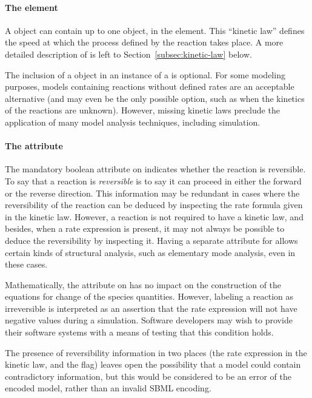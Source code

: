 \paragraph{The  element}

A \Reaction object can contain up to one \KineticLaw object, in
the  element.  This ``kinetic law'' defines the
speed at which the process defined by the reaction takes place.  A
more detailed description of \KineticLaw is left to
Section~\ref{subsec:kinetic-law} below.

The inclusion of a \KineticLaw object in an instance of a
\Reaction is optional.  For some modeling purposes, models
containing reactions without defined rates are an acceptable
alternative (and may even be the only possible option, such as
when the kinetics of the reactions are unknown).  However, missing
kinetic laws preclude the application of many model analysis
techniques, including simulation.


\paragraph{The  attribute}
\label{sec:reversible}

The mandatory boolean attribute  on \Reaction
indicates whether the reaction is reversible.  To say that a
reaction is \emph{reversible} is to say it can proceed in either
the forward or the reverse direction.  This information may be
redundant in cases where the reversibility of the reaction can be
deduced by inspecting the rate formula given in the kinetic law.
However, a reaction is not required to have a kinetic law, and
besides, when a rate expression is present, it may not always be
possible to deduce the reversibility by inspecting it.  Having a
separate attribute for  allows certain kinds of
structural analysis, such as elementary mode analysis, even in
these cases.

Mathematically, the  attribute on \Reaction has
no impact on the construction of the equations for change of the
species quantities.  However, labeling a reaction as irreversible
is interpreted as an assertion that the rate expression will not
have negative values during a simulation.  Software developers may
wish to provide their software systems with a means of testing
that this condition holds.

The presence of reversibility information in two places (\ie the
rate expression in the kinetic law, and the 
flag) leaves open the possibility that a model could contain
contradictory information, but this would be considered to be an
error of the encoded model, rather than an invalid SBML encoding.


